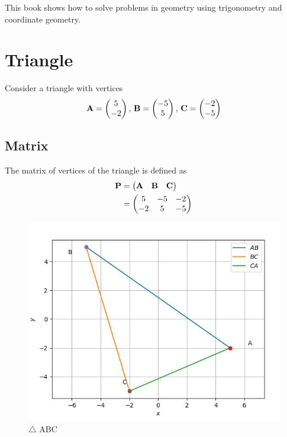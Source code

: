 \documentclass[10pt]{book}
\begin{document}
\frontmatter
\subtitle{Through Algebra}
\titlepage
\tableofcontents
\setcounter{page}{0}
\begin{introduction}
This book shows how to solve problems in geometry using trigonometry and coordinate geometry. 
\end{introduction}
\mainmatter
\chapter{Triangle}
Consider a triangle with vertices
		\begin{align}
			\label{eq:tri-pts}
			\vec{A} = \myvec{5 \\ -2},\,
			\vec{B} = \myvec{-5 \\ 5},\,
			\vec{C} = \myvec{-2 \\ -5}
		\end{align}
\section{Matrix}
The matrix of vertices of the triangle is defined as
		\begin{align}
			\mathbf{P} &= \begin{pmatrix}\mathbf{A} & \mathbf{B} &\mathbf{C}\end{pmatrix} \\
            &=\begin{pmatrix}5 & -5 & -2 \\ -2 & 5 & -5\end{pmatrix}
		\end{align}
\begin{figure}[H]
    \centering
    \includegraphics{figs/ABCtriangle.jpg}
    \caption{$\triangle$ ABC}
    \label{fig:ABCtriangle.jpg}
\end{figure}
\end{document}
